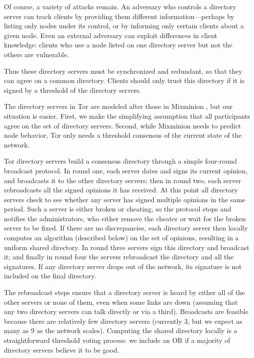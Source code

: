 \documentclass[times,10pt,twocolumn]{article}
\begin{document}
Of course, a variety of attacks remain. An adversary who controls
a directory server can track clients by providing them different
information---perhaps by listing only nodes under its control, or by
informing only certain clients about a given node. Even an external
adversary can exploit differences in client knowledge: clients who use
a node listed on one directory server but not the others are vulnerable.

Thus these directory servers must be synchronized and redundant, so
that they can agree on a common directory.  Clients should only trust
this directory if it is signed by a threshold of the directory
servers.

The directory servers in Tor are modeled after those in Mixminion
\cite{minion-design}, but our situation is easier. First, we make the
simplifying assumption that all participants agree on the set of
directory servers. Second, while Mixminion needs to predict node
behavior, Tor only needs a threshold consensus of the current
state of the network.

Tor directory servers build a consensus directory through a simple
four-round broadcast protocol.  In round one, each server dates and
signs its current opinion, and broadcasts it to the other directory
servers; then in round two, each server rebroadcasts all the signed
opinions it has received.  At this point all directory servers check
to see whether any server has signed multiple opinions in the same
period. Such a server is either broken or cheating, so the protocol
stops and notifies the administrators, who either remove the cheater
or wait for the broken server to be fixed.  If there are no
discrepancies, each directory server then locally computes an algorithm
(described below)
on the set of opinions, resulting in a uniform shared directory. In
round three servers sign this directory and broadcast it; and finally
in round four the servers rebroadcast the directory and all the
signatures.  If any directory server drops out of the network, its
signature is not included on the final directory.

The rebroadcast steps ensure that a directory server is heard by
either all of the other servers or none of them, even when some links
are down (assuming that any two directory servers can talk directly or
via a third). Broadcasts are feasible because there are relatively few
directory servers (currently 3, but we expect as many as 9 as the network
scales). Computing the shared directory locally is a straightforward
threshold voting process: we include an OR if a majority of directory
servers believe it to be good.
\end{document}

